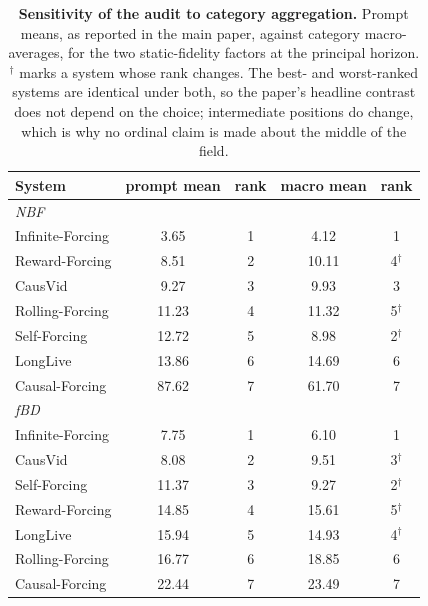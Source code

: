 \begin{table}[tb]
\centering
\small
\setlength{\tabcolsep}{5pt}
\begin{tabular}{l c c c c}
\toprule
System & prompt mean & rank & macro mean & rank \\
\midrule
\multicolumn{5}{l}{\emph{NBF}} \\
\quad Infinite-Forcing & 3.65 & 1 & 4.12 & 1 \\
\quad Reward-Forcing & 8.51 & 2 & 10.11 & 4$^{\dagger}$ \\
\quad CausVid & 9.27 & 3 & 9.93 & 3 \\
\quad Rolling-Forcing & 11.23 & 4 & 11.32 & 5$^{\dagger}$ \\
\quad Self-Forcing & 12.72 & 5 & 8.98 & 2$^{\dagger}$ \\
\quad LongLive & 13.86 & 6 & 14.69 & 6 \\
\quad Causal-Forcing & 87.62 & 7 & 61.70 & 7 \\
\multicolumn{5}{l}{\emph{fBD}} \\
\quad Infinite-Forcing & 7.75 & 1 & 6.10 & 1 \\
\quad CausVid & 8.08 & 2 & 9.51 & 3$^{\dagger}$ \\
\quad Self-Forcing & 11.37 & 3 & 9.27 & 2$^{\dagger}$ \\
\quad Reward-Forcing & 14.85 & 4 & 15.61 & 5$^{\dagger}$ \\
\quad LongLive & 15.94 & 5 & 14.93 & 4$^{\dagger}$ \\
\quad Rolling-Forcing & 16.77 & 6 & 18.85 & 6 \\
\quad Causal-Forcing & 22.44 & 7 & 23.49 & 7 \\
\bottomrule
\end{tabular}
\caption{\textbf{Sensitivity of the audit to category aggregation.} Prompt means, as reported in the main paper, against category macro-averages, for the two static-fidelity factors at the principal horizon. $^{\dagger}$ marks a system whose rank changes. The best- and worst-ranked systems are identical under both, so the paper's headline contrast does not depend on the choice; intermediate positions do change, which is why no ordinal claim is made about the middle of the field.}
\label{tab:aggregation}
\end{table}